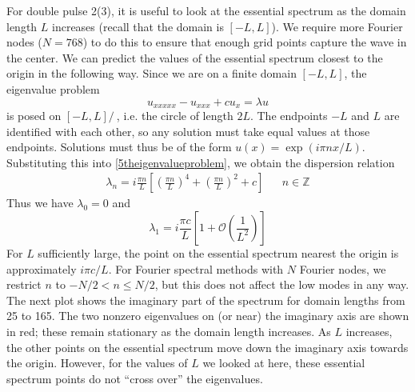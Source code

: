 \documentclass[12pt]{article}
\def\Z{{\mathbb Z}}
\begin{document}
For double pulse 2(3), it is useful to look at the essential spectrum as the domain length $L$ increases (recall that the domain is $[-L, L]$). We require more Fourier nodes ($N = 768$) to do this to ensure that enough grid points capture the wave in the center. We can predict the values of the essential spectrum closest to the origin in the following way. Since we are on a finite domain $[-L, L]$, the eigenvalue problem
\begin{equation}\label{5theigenvalueproblem}
u_{xxxxx} - u_{xxx} + cu_x = \lambda u
\end{equation}
is posed on $[-L, L]/~$, i.e. the circle of length $2L$. The endpoints $-L$ and $L$ are identified with each other, so any solution must take equal values at those endpoints. Solutions must thus be of the form $u(x) = \exp(i \pi n x/L)$. Substituting this into \ref{5theigenvalueproblem}, we obtain the dispersion relation
\begin{align}\label{5thdispersion}
\lambda_n = i \frac{\pi n}{L} \left[ \left(\frac{\pi n}{L}\right)^4  + \left(\frac{\pi n}{L}\right)^2 + c \right] && n \in \Z
\end{align}
Thus we have $\lambda_0 = 0$ and
\begin{equation*}
\lambda_1 = i \frac{\pi c}{L} \left[ 1 + \mathcal{O} \left(\frac{1}{L^2} \right)\right]
\end{equation*}
For $L$ sufficiently large, the point on the essential spectrum nearest the origin is approximately $i \pi c / L$. For Fourier spectral methods with $N$ Fourier nodes, we restrict $n$ to $-N/2 < n \leq N/2$, but this does not affect the low modes in any way.\\

The next plot shows the imaginary part of the spectrum for domain lengths from 25 to 165. The two nonzero eigenvalues on (or near) the imaginary axis are shown in red; these remain stationary as the domain length increases. As $L$ increases, the other points on the essential spectrum move down the imaginary axis towards the origin. However, for the values of $L$ we looked at here, these essential spectrum points do not ``cross over'' the eigenvalues. \\
\end{document}
